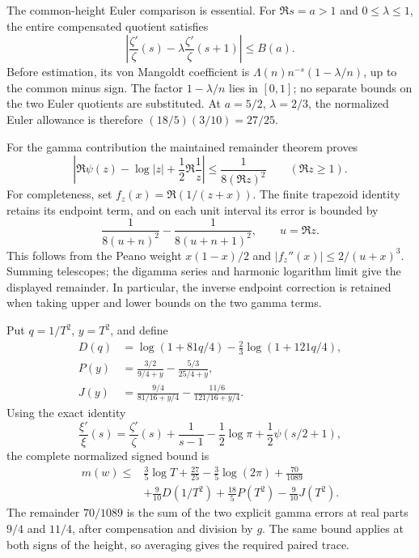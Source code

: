 The common-height Euler comparison is essential. For \(\Re s=a>1\)
and \(0\le\lambda\le1\), the entire compensated quotient satisfies
\[
 \left|\frac{\zeta'}{\zeta}(s)
       -\lambda\frac{\zeta'}{\zeta}(s+1)\right|\le B(a).
\]
Before estimation, its von Mangoldt coefficient is
\(\Lambda(n)n^{-s}(1-\lambda/n)\), up to the common minus sign.
The factor \(1-\lambda/n\) lies in \([0,1]\); no separate bounds
on the two Euler quotients are substituted. At \(a=5/2\),
\(\lambda=2/3\), the normalized Euler allowance is therefore
\((18/5)(3/10)=27/25\).

For the gamma contribution the maintained remainder theorem proves
\[
 \left|\Re\psi(z)-\log|z|+\frac12\Re\frac1z\right|
       \le\frac1{8(\Re z)^2}\qquad(\Re z\ge1).
\]
For completeness, set \(f_z(x)=\Re(1/(z+x))\). The finite
trapezoid identity retains its endpoint term, and on each unit interval
its error is bounded by
\[
 \frac1{8(u+n)^2}-\frac1{8(u+n+1)^2},\qquad u=\Re z.
\]
This follows from the Peano weight \(x(1-x)/2\) and
\(|f_z''(x)|\le2/(u+x)^3\). Summing telescopes; the digamma series
and harmonic logarithm limit give the displayed remainder. In
particular, the inverse endpoint correction is retained when taking
upper and lower bounds on the two gamma terms.

Put \(q=1/T^2\), \(y=T^2\), and define
\begin{align*}
 D(q)&=\log(1+81q/4)-\frac23\log(1+121q/4),\\
 P(y)&=\frac{3/2}{9/4+y}-\frac{5/3}{25/4+y},\\
 J(y)&=\frac{9/4}{81/16+y/4}-\frac{11/6}{121/16+y/4}.
\end{align*}
Using the exact identity
\[
 \frac{\xi'}{\xi}(s)=\frac{\zeta'}{\zeta}(s)+\frac1{s-1}
             -\frac12\log\pi+\frac12\psi(s/2+1),
\]
the complete normalized signed bound is
\begin{align*}
 m(w)\le{}&\frac35\log T+\frac{27}{25}-\frac35\log(2\pi)
              +\frac{70}{1089}\\
          &+\frac9{10}D(1/T^2)+\frac{18}{5}P(T^2)
                                      -\frac9{10}J(T^2).
\end{align*}
The remainder \(70/1089\) is the sum of the two explicit gamma
errors at real parts \(9/4\) and \(11/4\), after compensation
and division by \(g\). The same bound applies at both signs of the
height, so averaging gives the required paired trace.

